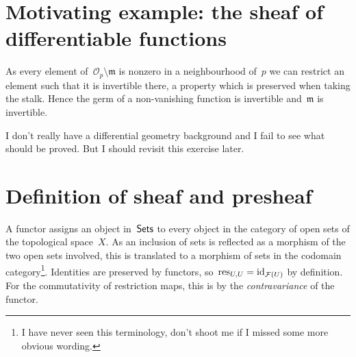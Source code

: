 \section{Motivating example: the sheaf of differentiable functions}

\begin{exercise}
  As every element of~$\mathcal{O}_p\setminus\mathfrak{m}$ is nonzero in a neighbourhood of~$p$ we can restrict an element such that it is invertible there, a property which is preserved when taking the stalk. Hence the germ of a non-vanishing function is invertible and~$\mathfrak{m}$ is invertible.
\end{exercise}

\begin{exercise} %
  I don't really have a differential geometry background and I fail to see what should be proved. But I should revisit this exercise later.
\end{exercise}


\section{Definition of sheaf and presheaf}

\begin{exercise}
  A functor assigns an object in~$\mathsf{Sets}$ to every object in the category of open sets of the topological space~$X$. As an inclusion of sets is reflected as a morphism of the two open sets involved, this is translated to a morphism of sets in the codomain category\footnote{I have never seen this terminology, don't shoot me if I missed some more obvious wording.}. Identities are preserved by functors, so~$\operatorname{res}_{U,U}=\mathrm{id}_{\mathcal{F}(U)}$ by definition. For the commutativity of restriction maps, this is by the \emph{contravariance} of the functor.
\end{exercise}

